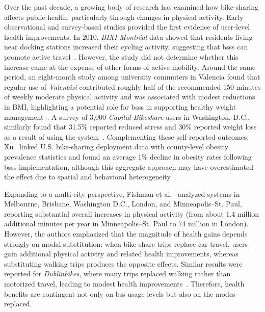    Over the past decade, a growing body of research has examined how bike-sharing affects public health, particularly through changes in physical activity. Early observational and survey-based studies provided the first evidence of user-level health improvements. In 2010, \textit{BIXI Montréal} data showed that residents living near docking stations increased their cycling activity, suggesting that \acp{bss} can promote active travel~\cite{Fuller2013}. However, the study did not determine whether this increase came at the expense of other forms of active mobility. Around the same period, an eight-month study among university commuters in Valencia found that regular use of \textit{Valenbisi} contributed roughly half of the recommended 150 minutes of weekly moderate physical activity and was associated with modest reductions in BMI, highlighting a potential role for \acp{bss} in supporting healthy weight management~\cite{Molina-Garcia2013}. A survey of 3,000 \textit{Capital Bikeshare} users in Washington, D.C., similarly found that 31.5\% reported reduced stress and 30\% reported weight loss as a result of using the system~\cite{Alberts2012}. Complementing these self-reported outcomes, Xu~\cite{Xu2019} linked U.S. bike-sharing deployment data with county-level obesity prevalence statistics and found an average 1\% decline in obesity rates following \acp{bss} implementation, although this aggregate approach may have overestimated the effect due to spatial and behavioral heterogeneity~\cite{Hosford2019}.

    Expanding to a multi-city perspective, Fishman et al.~\cite{Fishman2014} analyzed systems in Melbourne, Brisbane, Washington D.C., London, and Minneapolis–St. Paul, reporting substantial overall increases in physical activity (from about 1.4 million additional minutes per year in Minneapolis–St. Paul to 74 million in London). However, the authors emphasized that the magnitude of health gains depends strongly on modal substitution: when bike-share trips replace car travel, users gain additional physical activity and related health improvements, whereas substituting walking trips produces the opposite effects. Similar results were reported for \textit{Dublinbikes}, where many trips replaced walking rather than motorized travel, leading to modest health improvements~\cite{Murphy2015}. Therefore, health benefits are contingent not only on \ac{bss} usage levels but also on the modes replaced.

